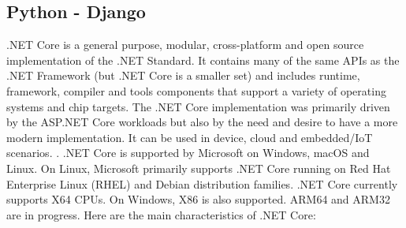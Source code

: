\documentclass[../thesis.tex]{subfiles}
\begin{document}
\subsection{Python - Django}
\vspace{5mm}
.NET Core is a general purpose, modular, cross-platform and open source implementation of the .NET Standard. It contains many of the same APIs as the .NET Framework (but .NET Core is a smaller set) and includes runtime, framework, compiler and tools components that support a variety of operating systems and chip targets. The .NET Core implementation was primarily driven by the ASP.NET Core workloads but also by the need and desire to have a more modern implementation. It can be used in device, cloud and embedded/IoT scenarios. \cite{dotnet}.
\vspace{5mm}
.NET Core is supported by Microsoft on Windows, macOS and Linux. On Linux, Microsoft primarily supports .NET Core running on Red Hat Enterprise Linux (RHEL) and Debian distribution families. .NET Core currently supports X64 CPUs. On Windows, X86 is also supported. ARM64 and ARM32 are in progress.
\vspace{5mm}
Here are the main characteristics of .NET Core:
\vspace{5mm}
\end{document}
